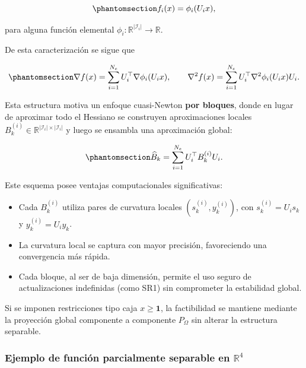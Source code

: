 \documentclass[
  spanish,
  us-letterpaper,
]{scrreprt}
\providecommand{\tightlist}{%
  \setlength{\itemsep}{0pt}\setlength{\parskip}{0pt}}
\numberwithin{equation}{section}
\begin{document}
\begin{equation}\phantomsection\label{eq-141}{
f_i(x)=\phi_i(U_i x),
}\end{equation}

para alguna función elemental
\(\phi_i:\mathbb{R}^{|\mathcal{I}_i|}\to\mathbb{R}\).

De esta caracterización se sigue que

\begin{equation}\phantomsection\label{eq-142}{
\nabla f(x)=\sum_{i=1}^{N_e} U_i^\top \nabla \phi_i(U_i x), 
\qquad
\nabla^2 f(x)=\sum_{i=1}^{N_e} U_i^\top \nabla^2 \phi_i(U_i x) U_i.
}\end{equation}

Esta estructura motiva un enfoque cuasi-Newton \textbf{por bloques},
donde en lugar de aproximar todo el Hessiano se construyen
aproximaciones locales
\(B_k^{(i)}\in\mathbb{R}^{|\mathcal{I}_i|\times|\mathcal{I}_i|}\) y
luego se ensambla una aproximación global:

\begin{equation}\phantomsection\label{eq-143}{
\widehat{B}_k = \sum_{i=1}^{N_e} U_i^\top B_k^{(i)} U_i.
}\end{equation}

Este esquema posee ventajas computacionales significativas:

\begin{itemize}
\tightlist
\item
  Cada \(B_k^{(i)}\) utiliza pares de curvatura locales
  \((s_k^{(i)},y_k^{(i)})\), con \(s_k^{(i)}=U_i s_k\) y
  \(y_k^{(i)}=U_i y_k\).
\item
  La curvatura local se captura con mayor precisión, favoreciendo una
  convergencia más rápida.
\item
  Cada bloque, al ser de baja dimensión, permite el uso seguro de
  actualizaciones indefinidas (como SR1) sin comprometer la estabilidad
  global.
\end{itemize}

Si se imponen restricciones tipo caja \(x\ge \mathbf{1}\), la
factibilidad se mantiene mediante la proyección global componente a
componente \(P_\Omega\) sin alterar la estructura separable.

\subsubsection{\texorpdfstring{Ejemplo de función parcialmente separable
en
\(\mathbb{R}^4\)}{Ejemplo de función parcialmente separable en \textbackslash mathbb\{R\}\^{}4}}\label{ejemplo-de-funciuxf3n-parcialmente-separable-en-mathbbr4}
\end{document}
